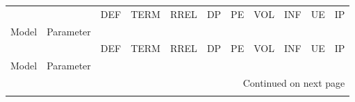 \begin{longtable}{llrrrrrrrrr}
\label{tab:SSD_loss_30_ABS_FP}\\
\toprule
     &     &   DEF &  TERM &  RREL &    DP &    PE &   VOL &   INF &    UE &    IP \\
Model & Parameter &       &       &       &       &       &       &       &       &       \\
\midrule
\endfirsthead

\toprule
     &     &   DEF &  TERM &  RREL &    DP &    PE &   VOL &   INF &    UE &    IP \\
Model & Parameter &       &       &       &       &       &       &       &       &       \\
\midrule
\endhead
\midrule
\multicolumn{11}{r}{{Continued on next page}} \\
\midrule
\endfoot


\end{longtable}
